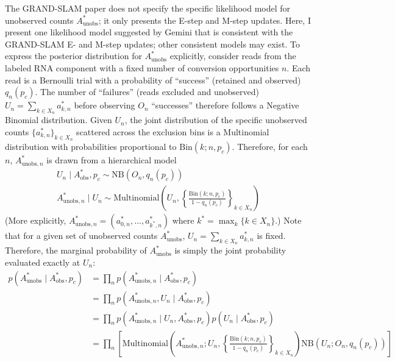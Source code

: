 \documentclass[11pt]{article}
\begin{document}
The GRAND-SLAM paper does not specify the specific likelihood model for unobserved counts $A_\text{unobs}^*$; it only presents the E-step and M-step updates. Here, I present one likelihood model suggested by Gemini that is consistent with the GRAND-SLAM E- and M-step updates; other consistent models may exist. To express the posterior distribution for $A_\text{unobs}^*$ explicitly, consider reads from the labeled RNA component with a fixed number of conversion opportunities $n$. Each read is a Bernoulli trial with a probability of ``success'' (retained and observed) $q_n(p_c)$. The number of ``failures'' (reads excluded and unobserved) $U_n = \sum_{k \in X_n} a^*_{k,n}$ before observing $O_n$ ``successes'' therefore follows a Negative Binomial distribution. Given $U_n$, the joint distribution of the specific unobserved counts $\{a^*_{k,n}\}_{k \in X_n}$ scattered across the exclusion bins is a Multinomial distribution with probabilities proportional to $\mathrm{Bin}(k;n,p_c)$. Therefore, for each $n$, $A_{\text{unobs},n}^*$ is drawn from a hierarchical model
$$
\begin{gathered}
U_n \mid A_\text{obs}^*, p_c \sim \mathrm{NB}(O_n, q_n(p_c)) \\
A_{\text{unobs}, n}^* \mid U_n \sim \mathrm{Multinomial} \left(U_n, \left\{ \frac{\mathrm{Bin}(k;n,p_c)}{1-q_n(p_c)} \right\}_{k \in X_n} \right)
\end{gathered}
$$
(More explicitly, $A_{\text{unobs}, n}^* = (a^*_{0,n},\dots,a^*_{k^*,n})$ where $k^* = \max_k \{k \in X_n\}$.) Note that for a given set of unobserved counts $A_{\text{unobs}}^*$, $U_n = \sum_{k \in X_n} a^*_{k,n}$ is fixed. Therefore, the marginal probability of $A_{\text{unobs}}^*$ is simply the joint probability evaluated exactly at $U_n$:
$$
\begin{aligned}
p(A_\text{unobs}^* \mid A_\text{obs}^*, p_c)
&= \prod_n p(A_{\text{unobs},n}^* \mid A_\text{obs}^*, p_c) \\
&= \prod_n p(A_{\text{unobs},n}^*, U_n \mid A_\text{obs}^*, p_c) \\
&= \prod_n p(A_{\text{unobs},n}^* \mid U_n, A_\text{obs}^*, p_c) p(U_n \mid A_\text{obs}^*, p_c) \\
&= \prod_n \left[ \mathrm{Multinomial} \left(A_{\text{unobs},n}^*; U_n, \left\{ \frac{\mathrm{Bin}(k;n,p_c)}{1-q_n(p_c)} \right\}_{k \in X_n} \right) \mathrm{NB}(U_n; O_n, q_n(p_c)) \right]
\end{aligned}
$$
\end{document}
